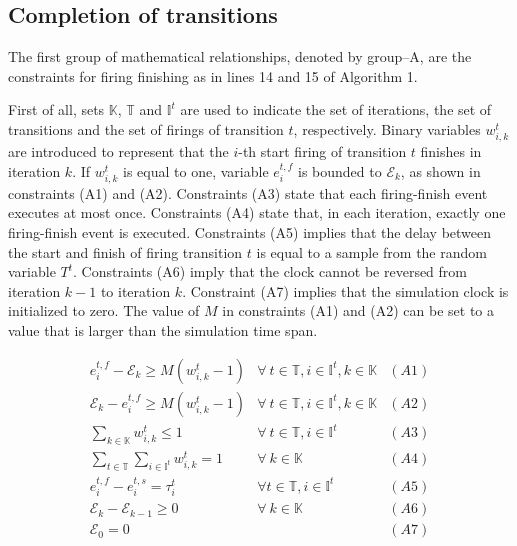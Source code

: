 \documentclass[suppldata]{interact}
\theoremstyle{plain}
\theoremstyle{definition}
\theoremstyle{remark}
\begin{document}
\subsection{Completion of transitions}

The first group of mathematical relationships, denoted by group--A, are the constraints for firing %
finishing as in lines 14 and 15 of Algorithm 1. 

First of all, sets $\mathbb{K}$, $\mathbb{T}$ and $\mathbb{I}^t$ are used to indicate the set of iterations, the set of transitions and the set of firings of transition $t$, respectively.
Binary variables $w^{t}_{i,k}$ are introduced to represent that the $i$-th start firing of transition $t$ finishes in iteration $k$. If $w^{t}_{i,k}$  is equal to one, %
variable $e^{t,f}_{i}$ is bounded to $\mathcal{E}_k$, as shown in constraints (A1) and (A2). Constraints (A3) state that each firing-finish event executes at most once. Constraints (A4) state that, in each iteration, exactly one firing-finish event is executed. Constraints (A5) implies that the delay between the start and finish of firing transition $t$ is equal to a sample from the random variable $T^{t}$. Constraints (A6) imply that the clock cannot be reversed from iteration $k-1$ to iteration $k$. Constraint (A7) implies that the simulation clock is initialized to zero. The value of $M$ in constraints (A1) and (A2) can be set to a value that is larger than the simulation time span.

\begin{eqnarray}
	e^{t,f}_i-\mathcal{E}_k\ge M(w^{t}_{i,k}-1) & \forall\ t\in\mathbb{T},i\in \mathbb{I}^{t},k\in \mathbb{K}&(A1)\nonumber\\
	\mathcal{E}_k-e^{t,f}_i\ge M(w^{t}_{i,k}-1) & \forall\ t\in\mathbb{T},i\in \mathbb{I}^{t},k\in \mathbb{K}&(A2)\nonumber\\
	\sum_{k\in \mathbb{K}} w^{t}_{i,k} \le 1& \forall\ t\in\mathbb{T},i\in \mathbb{I}^{t}&(A3)\nonumber\\
	\sum_{t\in \mathbb{T}}\sum_{i\in \mathbb{I}^{t}} w^{t}_{i,k} =1&\forall\ k\in \mathbb{K}&(A4)\nonumber\\
	e^{t,f}_{i} - e^{t,s}_{i} = \tau^{t}_{i} & \forall t\in\mathbb{T}, i\in \mathbb{I}^{t}&(A5) \nonumber\\
	\mathcal{E}_{k}-\mathcal{E}_{k-1}\ge 0&\forall\ k\in \mathbb{K}&(A6)\nonumber\\
	\mathcal{E}_0 = 0&&(A7)\nonumber
\end{eqnarray}
\end{document}
